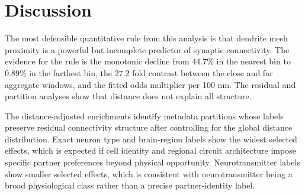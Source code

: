 \documentclass[11pt]{article}
\begin{document}
\begin{table}[htbp]
\centering
\small
\caption{Side pairs with the largest positive and negative distance-adjusted effects among selected supported pairs.}
\label{tab:side-extremes}
\end{table}

\section{Discussion}

The most defensible quantitative rule from this analysis is that dendrite mesh proximity is a powerful but incomplete predictor of synaptic connectivity. The evidence for the rule is the monotonic decline from 44.7\% in the nearest bin to 0.89\% in the farthest bin, the 27.2 fold contrast between the close and far aggregate windows, and the fitted odds multiplier per 100 nm. The residual and partition analyses show that distance does not explain all structure.

The distance-adjusted enrichments identify metadata partitions whose labels preserve residual connectivity structure after controlling for the global distance distribution. Exact neuron type and brain-region labels show the widest selected effects, which is expected if cell identity and regional circuit architecture impose specific partner preferences beyond physical opportunity. Neurotransmitter labels show smaller selected effects, which is consistent with neurotransmitter being a broad physiological class rather than a precise partner-identity label.
\end{document}
